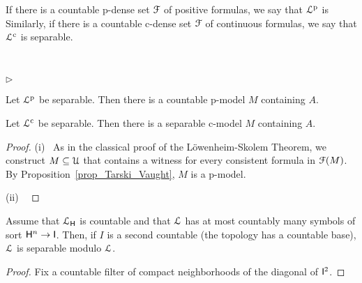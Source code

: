 \documentclass[10pt,oneside]{amsproc}
\newcommand{\mylabel}[1]{{#1}\hfill}
\renewenvironment{itemize}
  {\begin{list}{$\triangleright$}{%
  \setlength{\parskip}{0mm}
  \setlength{\topsep}{.4\baselineskip}
  \setlength{\rightmargin}{0mm}
  \setlength{\listparindent}{0mm}
  \setlength{\itemindent}{0mm}
  \setlength{\labelwidth}{3ex}
  \setlength{\itemsep}{.2\baselineskip}
  \setlength{\parsep}{.2\baselineskip}
  \setlength{\partopsep}{0mm}
  \setlength{\labelsep}{1ex}
  \setlength{\leftmargin}{\labelwidth+\labelsep}
  \let\makelabel\mylabel}}{%
\end{list}}
\renewcommand*{\emph}[1]{%
   \smash{\tikz[baseline]\node[rectangle, fill=teal!25, rounded corners, inner xsep=0.5ex, inner ysep=0.2ex, anchor=base, minimum height = 2.7ex]{\strut #1};}}
\begin{document}
{If there is a countable p-dense set ${\EuScript F}$ of positive formulas, we say that ${\EuScript L}^{\rm p}$ is \emph{separable.} 
Similarly, if there is a countable c-dense set ${\EuScript F}$ of continuous formulas, we say that ${\EuScript L}^{\rm c}$ is separable.

\begin{proposition}\label{prop_disjunction_dense}\ 
  \begin{itemize}
    \item[i.] Let ${\EuScript L}^{\rm p}$ be separable.
    Then there is a countable p-model $M$ containing $A$.
  \item[ii.] Let ${\EuScript L}^{\rm c}$ be separable.
  Then there is a separable c-model $M$ containing $A$.
  \end{itemize}
\end{proposition}

\begin{proof}
  (i) \ As in the classical proof of the L\"owenheim-Skolem Theorem, we construct $M\subseteq{\EuScript U}$ that contains a witness for every consistent formula in ${\EuScript F}(M)$.
  By Proposition~\ref{prop_Tarski_Vaught}, $M$ is a p-model.

  (ii) \ 
\end{proof}

\begin{proposition}
  Assume that ${\EuScript L}_{\sf H}$ is countable and that ${\EuScript L}$ has at most countably many symbols of sort ${\sf H}^n\to {\sf I}$.
  Then, if $I$ is a second countable (the topology has a countable base), ${\EuScript L}$ is separable modulo ${\EuScript L}$.
\end{proposition}

\begin{proof}
  Fix a countable filter of compact neighborhoods of the diagonal of ${\sf I}^2$.  
\end{proof}




}
\end{document}
